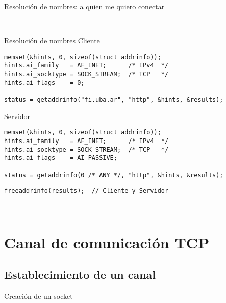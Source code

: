 \begin{frame}{Resoluci\'on de nombres: a quien me quiero conectar}
\end{frame}
~%


\begin{frame}[fragile]{Resoluci\'on de nombres}
    Cliente
      \begin{lstlisting}[style=normal]
memset(&hints, 0, sizeof(struct addrinfo));
hints.ai_family   = AF_INET;      /* IPv4  */
hints.ai_socktype = SOCK_STREAM;  /* TCP   */
hints.ai_flags    = 0;

status = getaddrinfo("fi.uba.ar", "http", &hints, &results);
      \end{lstlisting}
    Servidor
      \begin{lstlisting}[style=normal]
memset(&hints, 0, sizeof(struct addrinfo));
hints.ai_family   = AF_INET;      /* IPv4  */
hints.ai_socktype = SOCK_STREAM;  /* TCP   */
hints.ai_flags    = AI_PASSIVE;

status = getaddrinfo(0 /* ANY */, "http", &hints, &results);
      \end{lstlisting}
      \begin{lstlisting}[style=normal]
freeaddrinfo(results);  // Cliente y Servidor
      \end{lstlisting}
\end{frame}


~%
\section{Canal de comunicaci\'on TCP}
\subsection{Establecimiento de un canal}
\begin{frame}{Creaci\'on de un socket}
\end{frame}


